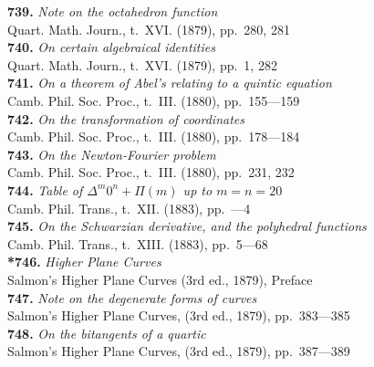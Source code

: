 \documentclass[12pt,a4paper,oneside]{book}
\theoremstyle{plain}
\theoremstyle{definition}
\theoremstyle{remark}
\begin{document}
\textbf{739.} \textit{Note on the octahedron function} \\
\hspace*{2em}Quart. Math. Journ., t.~XVI. (1879), pp.~280, 281\\[0.3em]
\textbf{740.} \textit{On certain algebraical identities} \\
\hspace*{2em}Quart. Math. Journ., t.~XVI. (1879), pp.~1, 282\\[0.3em]
\textbf{741.} \textit{On a theorem of Abel's relating to a quintic equation} \\
\hspace*{2em}Camb. Phil. Soc. Proc., t.~III. (1880), pp.~155---159\\[0.3em]
\textbf{742.} \textit{On the transformation of coordinates} \\
\hspace*{2em}Camb. Phil. Soc. Proc., t.~III. (1880), pp.~178---184\\[0.3em]
\textbf{743.} \textit{On the Newton-Fourier problem} \\
\hspace*{2em}Camb. Phil. Soc. Proc., t.~III. (1880), pp.~231, 232\\[0.3em]
\textbf{744.} \textit{Table of $\Delta^m 0^n + \Pi(m)$ up to $m=n=20$} \\
\hspace*{2em}Camb. Phil. Trans., t.~XII. (1883), pp.~---4\\[0.3em]
\textbf{745.} \textit{On the Schwarzian derivative, and the polyhedral functions} \\
\hspace*{2em}Camb. Phil. Trans., t.~XIII. (1883), pp.~5---68\\[0.3em]
\textbf{*746.} \textit{Higher Plane Curves} \\
\hspace*{2em}Salmon's Higher Plane Curves (3rd ed., 1879), Preface\\[0.3em]
\textbf{747.} \textit{Note on the degenerate forms of curves} \\
\hspace*{2em}Salmon's Higher Plane Curves, (3rd ed., 1879), pp.~383---385\\[0.3em]
\textbf{748.} \textit{On the bitangents of a quartic} \\
\hspace*{2em}Salmon's Higher Plane Curves, (3rd ed., 1879), pp.~387---389\\[0.3em]
\end{document}
